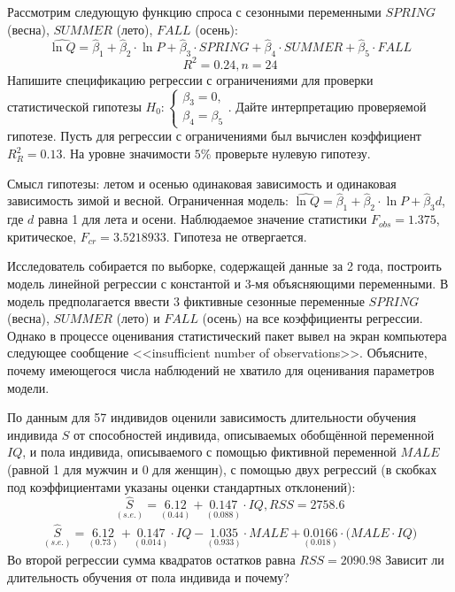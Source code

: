 \documentclass[pdftex,11pt,openany]{book}\usepackage[]{graphicx}\usepackage[]{color}
\begin{document}
\begin{problem} %
 Рассмотрим следующую функцию спроса с сезонными переменными $SPRING$ (весна), $SUMMER$ (лето), $FALL$ (осень):
\[
\widehat{\ln Q}=\hat{\beta}_1+\hat{\beta}_2\cdot{\ln P}+\hat{\beta}_3\cdot{SPRING}+\hat{\beta}_4\cdot{SUMMER}+\hat{\beta}_5\cdot{FALL}
\]
\[
R^2=0.24,n=24
\]
Напишите спецификацию регрессии с ограничениями для проверки статистической гипотезы 
$H_0: 
  \begin{cases}
    \beta_3=0, \\
    \beta_4=\beta_5 
 \end{cases}.$
Дайте интерпретацию проверяемой гипотезе. Пусть для регрессии с ограничениями был вычислен коэффициент $R_{R}^2=0.13$. На уровне значимости $5\%$ проверьте нулевую гипотезу.
\end{problem}

\begin{solution}
Смысл гипотезы: летом и осенью одинаковая зависимость и одинаковая зависимость зимой и весной. Ограниченная модель: $\widehat{\ln Q}=\hat{\beta}_1+\hat{\beta}_2\cdot{\ln P}+\hat{\beta}_3 d$, где $d$ равна 1 для лета и осени. Наблюдаемое значение статистики $F_{obs}=1.375$, критическое, $F_{cr}=3.5218933$. Гипотеза не отвергается.
\end{solution}


\begin{problem}
 Исследователь собирается по выборке, содержащей данные за 2 года,
построить модель линейной регрессии с константой и 3-мя объясняющими переменными. В модель предполагается ввести 3 фиктивные сезонные переменные $SPRING$ (весна), $SUMMER$ (лето) и $FALL$ (осень) на все коэффициенты регрессии. Однако в процессе оценивания статистический пакет вывел на экран компьютера следующее сообщение <<insufficient number of observations>>. Объясните, почему имеющегося числа наблюдений не хватило для оценивания параметров модели.
\end{problem}

\begin{solution}
\end{solution}


\begin{problem}
 По данным для 57 индивидов оценили зависимость длительности обучения индивида $S$ от способностей индивида, описываемых обобщённой переменной $IQ$, и пола индивида, описываемого с помощью фиктивной переменной $MALE$ (равной 1 для мужчин и 0 для женщин), с помощью двух регрессий (в скобках под коэффициентами указаны оценки стандартных отклонений):
\[
\underset{(s.e.)}{\hat{S}}=\underset{(0.44)}{6.12}+\underset{(0.088)}{0.147}\cdot{IQ}, RSS=2758.6
\]
\begin{multline}
\underset{(s.e.)}{\hat{S}}=\underset{(0.73)}{6.12}+\underset{(0.014)}{0.147}\cdot{IQ}-\underset{(0.933)}{1.035}\cdot{MALE}+\underset{(0.018)}{0.0166}\cdot{(MALE}\cdot{IQ)}
\end{multline}
Во второй регрессии сумма квадратов остатков равна $RSS=2090.98$
Зависит ли длительность обучения от пола индивида и почему?
\end{problem}
\end{document}
